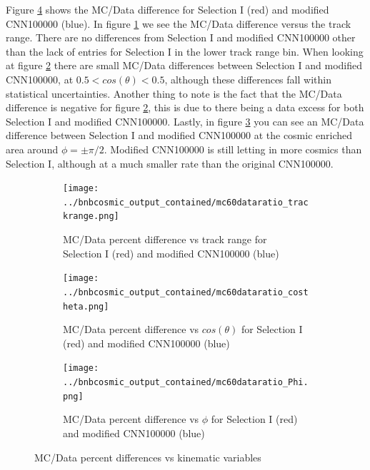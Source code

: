 Figure \ref{fig:diff_modified} shows the MC/Data difference for Selection I (red) and modified CNN100000 (blue). In figure \ref{fig:difftrack_modified} we see the MC/Data difference versus the track range. There are no differences from Selection I and modified CNN100000 other than the lack of entries for Selection I in the lower track range bin. When looking at figure \ref{fig:diffcostheta_modified} there are small MC/Data differences between Selection I and modified CNN100000, at $ 0.5<cos(\theta)<0.5$, although these differences fall within statistical uncertainties. Another thing to note is the fact that the MC/Data difference is negative for figure \ref{fig:diffcostheta_modified}, this is due to there being a data excess for both Selection I and modified CNN100000. Lastly, in figure \ref{fig:diffphi_modified} you can see an MC/Data difference between Selection I and modified CNN100000 at the cosmic enriched area around $\phi=\pm\pi/2$. Modified CNN100000 is still letting in more cosmics than Selection I, although at a much smaller rate than the original CNN100000. 
\begin{figure}[htp!]
\centering
	\begin{subfigure}[t]{.475\textwidth}
		\texttt{[image: ../bnbcosmic\_output\_contained/mc60dataratio\_trackrange.png]}
		\caption{MC/Data percent difference vs track range for Selection I (red) and modified CNN100000 (blue)} 
		\label{fig:difftrack_modified}
	\end{subfigure}
	\begin{subfigure}[t]{.475\textwidth}
	\centering
		\texttt{[image: ../bnbcosmic\_output\_contained/mc60dataratio\_costheta.png]}
		\caption{MC/Data percent difference vs $cos(\theta)$ for Selection I (red) and modified CNN100000 (blue)} 
		\label{fig:diffcostheta_modified}
	\end{subfigure}
	\begin{subfigure}[t]{.475\textwidth}
	\centering
		\texttt{[image: ../bnbcosmic\_output\_contained/mc60dataratio\_Phi.png]}
		\caption{MC/Data percent difference vs $\phi$ for Selection I (red) and modified CNN100000 (blue)} 
		\label{fig:diffphi_modified}
	\end{subfigure}
\caption{MC/Data percent differences vs kinematic variables}
\label{fig:diff_modified}
\end{figure}



